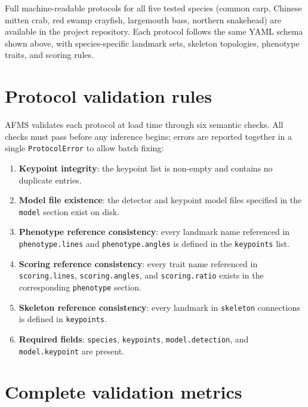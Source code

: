 \documentclass[9pt]{osa-supplemental-document}
\begin{document}
Full machine-readable protocols for all five tested species (common carp, Chinese mitten crab, red swamp crayfish, largemouth bass, northern snakehead) are available in the project repository. Each protocol follows the same YAML schema shown above, with species-specific landmark sets, skeleton topologies, phenotype traits, and scoring rules.

\section{Protocol validation rules}
\label{sec:validation}

AFMS validates each protocol at load time through six semantic checks. All checks must pass before any inference begins; errors are reported together in a single \texttt{ProtocolError} to allow batch fixing:

\begin{enumerate}
  \item \textbf{Keypoint integrity}: the keypoint list is non-empty and contains no duplicate entries.
  \item \textbf{Model file existence}: the detector and keypoint model files specified in the \texttt{model} section exist on disk.
  \item \textbf{Phenotype reference consistency}: every landmark name referenced in \texttt{phenotype.lines} and \texttt{phenotype.angles} is defined in the \texttt{keypoints} list.
  \item \textbf{Scoring reference consistency}: every trait name referenced in \texttt{scoring.lines}, \texttt{scoring.angles}, and \texttt{scoring.ratio} exists in the corresponding \texttt{phenotype} section.
  \item \textbf{Skeleton reference consistency}: every landmark in \texttt{skeleton} connections is defined in \texttt{keypoints}.
  \item \textbf{Required fields}: \texttt{species}, \texttt{keypoints}, \texttt{model.detection}, and \texttt{model.keypoint} are present.
\end{enumerate}

\section{Complete validation metrics}
\label{sec:validation_results}
\end{document}
